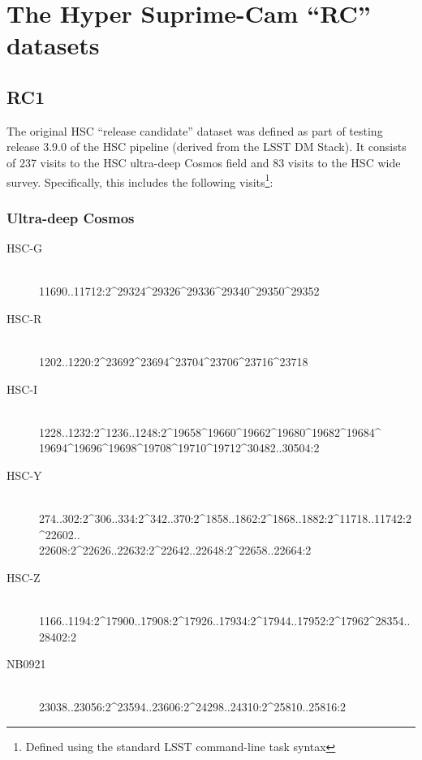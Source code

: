 \documentclass[DM,STS,toc]{lsstdoc}
\begin{document}



\appendix

\section{The Hyper Suprime-Cam ``RC'' datasets}

\subsection{RC1}

The original HSC ``release candidate'' dataset was defined as part of testing
release 3.9.0 of the HSC pipeline (derived from the LSST DM Stack). It
consists of 237 visits to the HSC ultra-deep Cosmos field and 83 visits to the
HSC wide survey. Specifically, this includes the following
visits\footnote{Defined using the standard LSST command-line task syntax}:

\subsubsection{Ultra-deep Cosmos}
\label{sec:hscrc1}

\begin{description}

\item[HSC-G]{\hfill \\ 11690..11712:2\^{}29324\^{}29326\^{}29336\^{}29340\^{}29350\^{}29352}
\item[HSC-R]{\hfill \\ 1202..1220:2\^{}23692\^{}23694\^{}23704\^{}23706\^{}23716\^{}23718}
\item[HSC-I]{\hfill \\ 1228..1232:2\^{}1236..1248:2\^{}19658\^{}19660\^{}19662\^{}19680\^{}19682\^{}19684\^{}\\19694\^{}19696\^{}19698\^{}19708\^{}19710\^{}19712\^{}30482..30504:2}
\item[HSC-Y]{\hfill \\ 274..302:2\^{}306..334:2\^{}342..370:2\^{}1858..1862:2\^{}1868..1882:2\^{}11718..11742:2\^{}22602..\\22608:2\^{}22626..22632:2\^{}22642..22648:2\^{}22658..22664:2}
\item[HSC-Z]{\hfill \\ 1166..1194:2\^{}17900..17908:2\^{}17926..17934:2\^{}17944..17952:2\^{}17962\^{}28354..28402:2}
\item[NB0921]{\hfill \\ 23038..23056:2\^{}23594..23606:2\^{}24298..24310:2\^{}25810..25816:2}

\end{description}
\end{document}
